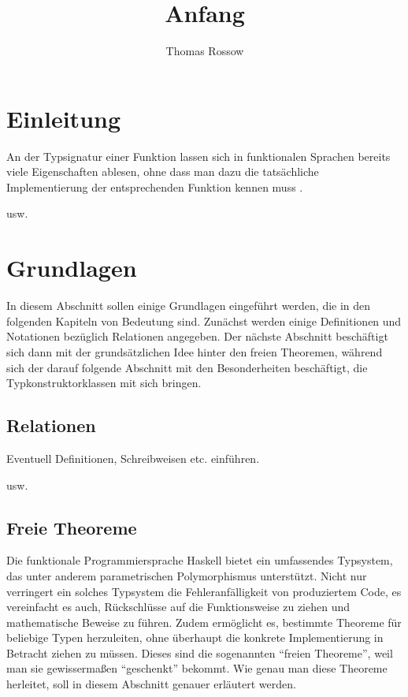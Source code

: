 \documentclass[11pt]{article} %
\title{Anfang}
\author{Thomas Rossow}
\begin{document}
\maketitle

\section{Einleitung}

An der Typsignatur einer Funktion lassen sich in funktionalen Sprachen bereits viele Eigenschaften ablesen, ohne dass man dazu die
tatsächliche Implementierung der entsprechenden Funktion kennen muss \cite{wadler}.

usw.

\section{Grundlagen}

In diesem Abschnitt sollen einige Grundlagen eingeführt werden, die in den folgenden Kapiteln von Bedeutung sind. Zunächst werden
einige Definitionen und Notationen bezüglich Relationen angegeben. Der nächste Abschnitt beschäftigt sich dann mit der
grundsätzlichen Idee hinter den freien Theoremen, während sich der darauf folgende Abschnitt mit den Besonderheiten beschäftigt,
die Typkonstruktorklassen mit sich bringen.

\subsection{Relationen}

Eventuell Definitionen, Schreibweisen etc. einführen.

usw.

\subsection{Freie Theoreme}
\label{sec:freie-theoreme}


Die funktionale Programmiersprache Haskell bietet ein umfassendes Typsystem, das unter anderem parametrischen Polymorphismus
unterstützt. Nicht nur verringert ein solches Typsystem die Fehleranfälligkeit von produziertem Code, es vereinfacht es auch,
Rückschlüsse auf die Funktionsweise zu ziehen und mathematische Beweise zu führen.
Zudem ermöglicht es, bestimmte Theoreme für beliebige Typen herzuleiten, ohne überhaupt die konkrete Implementierung
in Betracht ziehen zu müssen. Dieses sind die sogenannten ``freien Theoreme'', weil man sie gewissermaßen ``geschenkt''
bekommt. Wie genau man diese Theoreme herleitet, soll in diesem Abschnitt genauer erläutert werden.
\end{document}
